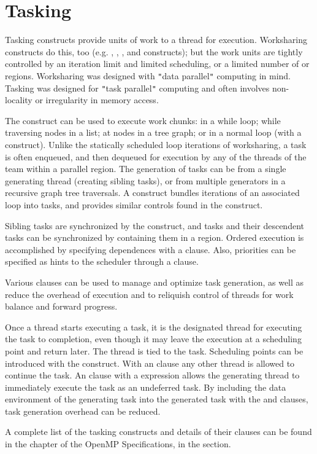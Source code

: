 \pagebreak
\chapter{Tasking}
\label{chap:tasking}

Tasking constructs provide units of work to a thread for execution.  
Worksharing constructs do this, too (e.g. , , 
, and  constructs); 
but the work units are tightly controlled by an iteration limit and limited 
scheduling, or a limited number of  or  regions. 
Worksharing was designed 
with \texttt{"}data parallel\texttt{"} computing in mind.  Tasking was designed for 
\texttt{"}task parallel\texttt{"} computing and often involves non-locality or irregularity 
in memory access.

The  construct can be used to execute work chunks: in a while loop; 
while traversing nodes in a list; at nodes in a tree graph; 
or in a normal loop (with a  construct).  
Unlike the statically scheduled loop iterations of worksharing, a task is 
often enqueued, and then dequeued for execution by any of the threads of the
team within a parallel region. The generation of tasks can be from a single 
generating thread (creating sibling tasks), or from multiple generators
in a recursive graph tree traversals. 
A  construct
bundles iterations of an associated loop into tasks, and provides 
similar controls found in the  construct.

Sibling tasks are synchronized by the  construct, and tasks
and their descendent tasks can be synchronized by containing them in
a  region.  Ordered execution is accomplished by specifying
dependences with a  clause. Also, priorities can be
specified as hints to the scheduler through a  clause.

Various clauses can be used to manage and optimize task generation,
as well as reduce the overhead of execution and to reliquish 
control of threads for work balance and forward progress. 

Once a thread starts executing a task, it is the designated thread 
for executing the task to completion, even though it may leave the
execution at a scheduling point and return later.  The thread is tied
to the task.  Scheduling points can be introduced with the 
construct.  With an  clause any other thread is allowed to continue
the task.  An  clause with a  expression allows the 
generating thread to immediately execute the task as an undeferred task.
By including the data environment of the generating task into the generated task with the 
 and  clauses, task generation overhead can be reduced.

A complete list of the tasking constructs and details of their clauses
can be found in the  chapter of the OpenMP Specifications,
in the  section.

